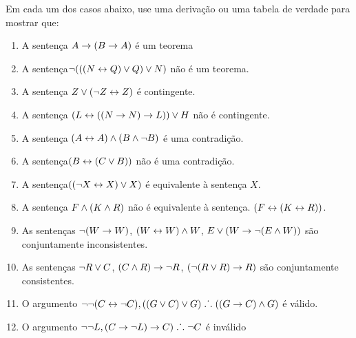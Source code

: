 \noindent\problempart Em cada um dos casos abaixo, use uma  deriva\c c\~ao ou uma tabela de verdade para mostrar que:
\begin{enumerate}%
\item A senten\c ca $A \rightarrow (B \rightarrow A)$ \'e um teorema
\item A senten\c ca$\neg (((N \leftrightarrow Q) \vee Q) \vee N)$ n\~ao \'e um teorema.
\item A senten\c ca $ Z \vee (\neg Z \leftrightarrow Z) $ \'e contingente.
\item A senten\c ca $ (L \leftrightarrow ((N \rightarrow N) \rightarrow L)) \vee H $ n\~ao \'e contingente.
\item A senten\c ca $ (A \leftrightarrow A) \wedge (B \wedge \neg B)$ \'e uma contradi\c c\~ao.
\item A senten\c ca$ (B \leftrightarrow (C \vee B)) $ n\~ao \'e uma contradi\c c\~ao. 
\item A senten\c ca$ ((\neg X \leftrightarrow X) \vee X) $  \'e equivalente \`a senten\c ca $X$.
\item A senten\c ca $F \wedge (K \wedge R) $ n\~ao  \'e equivalente \`a senten\c ca. $ (F \leftrightarrow (K \leftrightarrow R)) $.
\item As senten\c cas $ \neg (W \rightarrow W)$, $(W \leftrightarrow W) \wedge W$, $E \vee (W \rightarrow \neg (E \wedge W))$ s\~ao conjuntamente inconsistentes. 

\item As senten\c cas  $\neg R \vee C $, $(C \wedge R) \rightarrow \neg R$, $(\neg (R \vee R) \rightarrow R) $ s\~ao conjuntamente consistentes.
\item O argumento $\neg \neg (C \leftrightarrow \neg C), ((G \vee C) \vee G) \mathrel{\ldotp\dot{}\,\ldotp} ((G \rightarrow C) \wedge G) $ \'e v\'alido.
\item O argumento $ \neg \neg L,  (C \rightarrow \neg L) \rightarrow C) \mathrel{\ldotp\dot{}\,\ldotp} \neg C$  \'e  inv\'alido
\end{enumerate}

